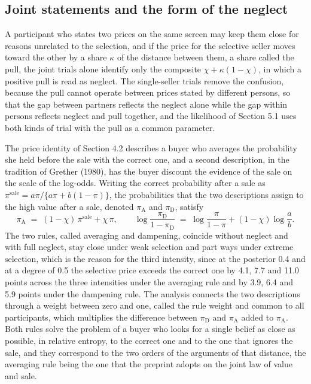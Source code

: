 \documentclass[11pt,a4paper]{article}
\begin{document}
\subsection{Joint statements and the form of the neglect}

A participant who states two prices on the same screen may keep them close for reasons unrelated to the selection, and if the price for the selective seller moves toward the other by a share $\kappa$ of the distance between them, a share called the pull, the joint trials alone identify only the composite $\chi+\kappa(1-\chi)$, in which a positive pull is read as neglect. The single-seller trials remove the confusion, because the pull cannot operate between prices stated by different persons, so that the gap between partners reflects the neglect alone while the gap within persons reflects neglect and pull together, and the likelihood of Section 5.1 uses both kinds of trial with the pull as a common parameter.

The price identity of Section 4.2 describes a buyer who averages the probability she held before the sale with the correct one, and a second description, in the tradition of Grether (1980), has the buyer discount the evidence of the sale on the scale of the log-odds. Writing the correct probability after a sale as $\pi^{\mathrm{sale}}=a\pi/\{a\pi+b(1-\pi)\}$, the probabilities that the two descriptions assign to the high value after a sale, denoted $\pi_{\mathrm{A}}$ and $\pi_{\mathrm{D}}$, satisfy
\[
\pi_{\mathrm{A}} \;=\; (1-\chi)\,\pi^{\mathrm{sale}}+\chi\,\pi,
\qquad
\log\frac{\pi_{\mathrm{D}}}{1-\pi_{\mathrm{D}}} \;=\; \log\frac{\pi}{1-\pi}+(1-\chi)\log\frac{a}{b}.
\]
The two rules, called averaging and dampening, coincide without neglect and with full neglect, stay close under weak selection and part ways under extreme selection, which is the reason for the third intensity, since at the posterior 0.4 and at a degree of 0.5 the selective price exceeds the correct one by 4.1, 7.7 and 11.0 points across the three intensities under the averaging rule and by 3.9, 6.4 and 5.9 points under the dampening rule. The analysis connects the two descriptions through a weight between zero and one, called the rule weight and common to all participants, which multiplies the difference between $\pi_{\mathrm{D}}$ and $\pi_{\mathrm{A}}$ added to $\pi_{\mathrm{A}}$. Both rules solve the problem of a buyer who looks for a single belief as close as possible, in relative entropy, to the correct one and to the one that ignores the sale, and they correspond to the two orders of the arguments of that distance, the averaging rule being the one that the preprint adopts on the joint law of value and sale.
\end{document}
